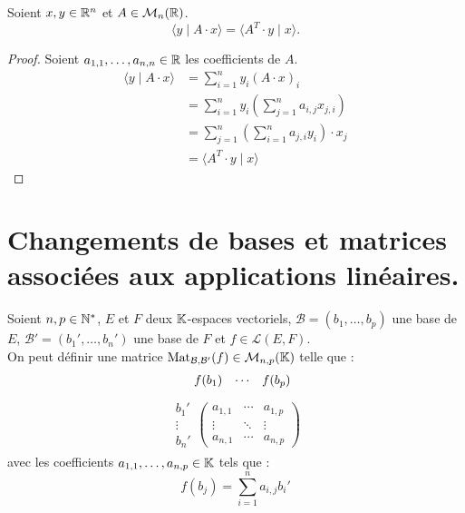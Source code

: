 \begin{lemma}
	Soient $x, y \in \mathbb{R}^n$ et $A \in \mathcal{M}_n(\mathbb{R})$.
	\[ \langle y \mid A \cdot x \rangle = \langle A^T \cdot y \mid x \rangle. \]
\end{lemma}

\begin{proof}
	Soient $a_{1,1}, \ldots, a_{n,n} \in \mathbb{R}$ les coefficients de $A$.
	\begin{align*}
		\langle y \mid A \cdot x \rangle &= \sum_{i = 1}^{n} y_i (A \cdot x)_i \\
		&= \sum_{i = 1}^{n} y_i \left( \sum_{j=1}^{n} a_{i,j} x_{j,i} \right) \\
		&= \sum_{j = 1}^{n} \left( \sum_{i = 1}^{n} a_{j,i} y_i \right) \cdot x_j \\
		&= \langle A^T \cdot y \mid x \rangle
	\end{align*}
\end{proof}

\section{Changements de bases et matrices associées aux applications linéaires.}

\begin{definition}
    Soient $n, p \in \mathbb{N}^*$, $E$ et $F$ deux $\mathbb{K}$-espaces vectoriels, $\mathcal{B} = (b_1, \ldots, b_p)$ une base de $E$, $\mathcal{B}' = (b_1', \ldots, b_n')$ une base de $F$ et $f \in \mathcal{L}(E, F)$.
    \\
    On peut définir une matrice $\operatorname{Mat}_{\mathcal{B},\mathcal{B}'} (f) \in \mathcal{M}_{n,p}(\mathbb{K})$ telle que :
    \begin{align*}
        \hspace{0.4cm}
        \begin{matrix}
            f(b_1) & \cdots & f(b_p) 
        \end{matrix}
    \end{align*}
    \begin{align*}
        \begin{matrix}
            b_1' \\
            \vdots \\ 
            b_n'
        \end{matrix}
        \begin{pmatrix}
            a_{1,1} & \cdots & a_{1,p} \\
            \vdots & \ddots & \vdots \\ 
            a_{n,1} & \cdots & a_{n,p}
        \end{pmatrix}
    \end{align*}
    avec les coefficients $a_{1,1}, \ldots, a_{n,p} \in \mathbb{K}$ tels que : 
    \[ f(b_j) = \sum_{i = 1}^n a_{i,j} b_i' \]
\end{definition}


